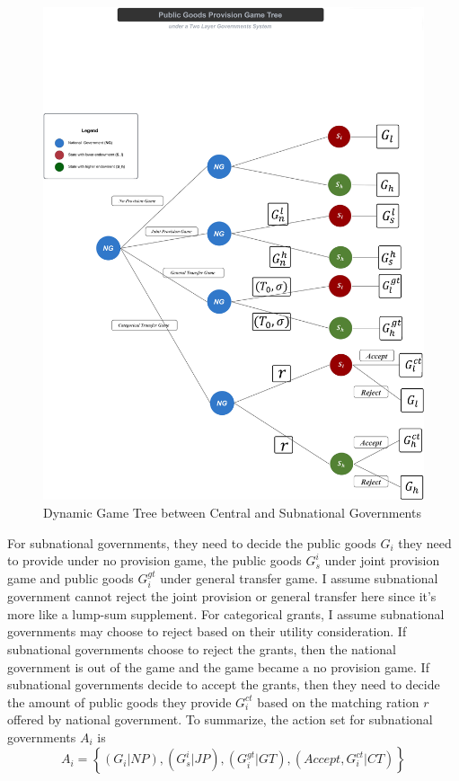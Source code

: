 \begin{itemize}
\newpage


\begin{landscape}
    \begin{figure}[H]
        \centering
        \includegraphics[scale=0.041]{Chapter-2/Figures/tree.jpg}
        \caption[Dynamic Game Tree of 3 players]{Dynamic Game Tree between Central and Subnational Governments
            \texttt{} }
        \label{dynamicgamenoutility}
    \end{figure}
\end{landscape}

\newpage

For subnational governments, they need to decide the public goods $G_i$ they need to provide under no provision game, the public goods $G_s^i$ under joint provision game and public goods $G_i^{gt}$ under general transfer game. I assume subnational government cannot reject the joint provision or general transfer here since it's more like a lump-sum supplement. For categorical grants, I assume subnational governments may choose to reject based on their utility consideration. If subnational governments choose to reject the grants, then the national government is out of the game and the game became a no provision game. If subnational governments decide to accept the grants, then they need to decide the amount of public goods they provide $G_i^{ct}$ based on the matching ration $r$ offered by national government. To summarize, the action set for subnational governments $A_i$ is  $$A_i=\left\{\left(G_i|NP\right),\left(G_s^i |J P \right),\left(G_i^{gt}|G T \right),\left(Accept,G_i^{ct}|C T\right)\right\} $$


\end{itemize}
